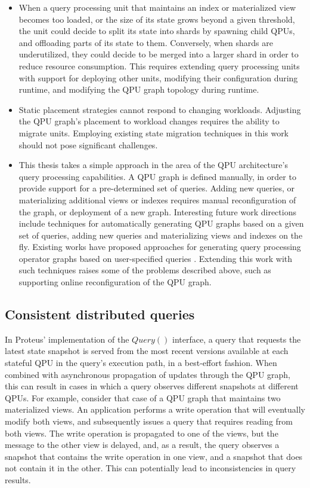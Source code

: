 \begin{itemize}
  \item When a query processing unit that maintains an index or materialized view becomes too loaded,
  or the size of its state grows beyond a given threshold,
  the unit could decide to split its state into shards by spawning child QPUs,
  and offloading parts of its state to them.
  Conversely, when shards are underutilized, they could decide to be merged into a larger shard in order
  to reduce resource consumption.
  This requires extending query processing units with support for deploying other units,
  modifying their configuration during runtime, and modifying the QPU graph topology during runtime.

  \item Static placement strategies cannot respond to changing workloads.
  Adjusting the QPU graph's placement to workload changes requires the ability to migrate units.
  Employing existing state migration techniques in this work should not pose significant challenges.

  \item This thesis takes a simple approach in the area of the QPU architecture's query processing capabilities.
  A QPU graph is defined manually, in order to provide support for a pre-determined set of queries.
  Adding new queries, or materializing additional views or indexes requires manual reconfiguration of the graph,
  or deployment of a new graph.
  Interesting future work directions include techniques for automatically generating QPU graphs based on a
  given set of queries,
  adding new queries and materializing views and indexes on the fly.
  Existing works have proposed approaches for generating query processing operator graphs based on user-specified queries
  \cite{gjengset:noria, kate:pequod}.
  Extending this work with such techniques raises some of the problems described above, such as supporting online
  reconfiguration of the QPU graph.

\end{itemize}

\subsection{Consistent distributed queries}
\label{sec:future_consistent_snapshots}
In Proteus' implementation of the $Query()$ interface,
a query that requests the latest state snapshot is served from the most recent versions available at each stateful QPU
in the query's execution path, in a best-effort fashion.
When combined with asynchronous propagation of updates through the QPU graph,
this can result in cases in which a query observes different snapshots at different QPUs.
For example, consider that case of a QPU graph that maintains two materialized views.
An application performs a write operation that will eventually modify both views,
and subsequently issues a query that requires reading from both views.
The write operation is propagated to one of the views, but the message to the other view is delayed,
and, as a result, the query observes a snapshot that contains the write operation in one view,
and a snapshot that does not contain it in the other.
This can potentially lead to inconsistencies in query results.

